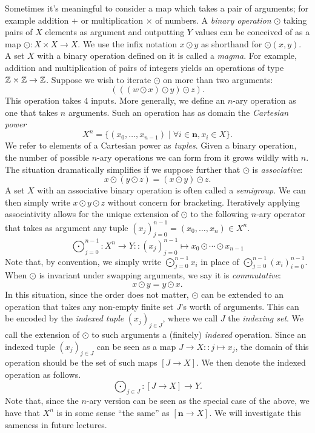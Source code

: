 Sometimes it's meaningful to consider a map which takes a pair of arguments; for example addition $+$ or multiplication $\times$ of numbers. A \emph{binary operation} $\odot$ taking pairs of $X$ elements as argument and outputting $Y$ values can be conceived of as a map $\odot:X\times X\to X$. We use the infix notation $x\odot y$ as shorthand for $\odot(x,y)$. A set $X$ with a binary operation defined on it is called a \emph{magma}. For example, addition and multiplication of pairs of integers yields an operations of type $\mathbb Z\times\mathbb Z\to\mathbb Z$. Suppose we wish to iterate $\odot$ on more than two arguments:
\[(((w\odot x)\odot y)\odot z).\]
This operation takes $4$ inputs. More generally, we define an $n$-ary operation as one that takes $n$ arguments. Such an operation has as domain the \emph{Cartesian power}
\[X^n=\{(x_0,\dots,x_{n-1})\mid \forall i\in\mathbf{n},x_i\in X\}.\]
We refer to elements of a Cartesian power as \emph{tuples}. Given a binary operation, the number of possible $n$-ary operations we can form from it grows wildly with $n$. The situation dramatically simplifies if we suppose further that $\odot$ is \emph{associative}:
\[x\odot(y\odot z)=(x\odot y)\odot z.\]
A set $X$ with an associative binary operation is often called a \emph{semigroup}. We can then simply write $x\odot y\odot z$ without concern for bracketing. Iteratively applying associativity allows for the unique extension of $\odot$ to the following $n$-ary operator that takes as argument any tuple $(x_j)_{j=0}^{n-1}=(x_0,\dots, x_n)\in X^n$.
\[\bigodot_{j=0}^{n-1}:X^n\to Y::(x_j)_{j=0}^{n-1}\mapsto x_0\odot\cdots\odot x_{n-1}\]
Note that, by convention, we simply write $\bigodot_{j=0}^{n-1}x_i$ in place of $\bigodot_{j=0}^{n-1}(x_i)_{i=0}^{n-1}$. When $\odot$ is invariant under swapping arguments, we say it is \emph{commutative}:
\[x\odot y=y\odot x.\]
In this situation, since the order does not matter, $\odot$ can be extended to an operation that takes any non-empty finite set $J$'s worth of arguments. This can be encoded by the \emph{indexed tuple} $(x_j)_{j\in J}$, where we call $J$ the \emph{indexing set}. We call the extension of $\odot$ to such arguments a (finitely) \emph{indexed} operation. Since an indexed tuple $(x_j)_{j\in J}$ can be seen as a map $J\to X::j\mapsto x_j$, the domain of this operation should be the set of such maps $[J\to X]$. We then denote the indexed operation as follows.
\[\bigodot_{j\in J}:[J\to X]\to Y.\] Note that, since the $n$-ary version can be seen as the special case of the above, we have that $X^n$ is in some sense ``the same'' as $[\mathbf{n}\to X]$. We will investigate this sameness in future lectures.

